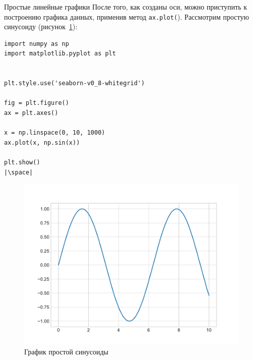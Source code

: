\documentclass[aspectratio=169, mathserif]{beamer}	%
\begin{document}
\begin{frame}[fragile, label=m]{Простые линейные графики}
\scriptsize
После того, как созданы оси, можно приступить к построению графика данных, применив метод \texttt{ax.plot(}). Рассмотрим простую синусоиду (рисунок~\ref{fig:fig_4}):
\vfill
\begin{minipage}{.4\textwidth}
\begin{verbatim}
import numpy as np
import matplotlib.pyplot as plt


plt.style.use('seaborn-v0_8-whitegrid')

fig = plt.figure()
ax = plt.axes()

x = np.linspace(0, 10, 1000)
ax.plot(x, np.sin(x))

plt.show()
|\space|
\end{verbatim}
\end{minipage}
\begin{minipage}{.59\textwidth}
\begin{figure}[h!]
	\centering
	\includegraphics[width=\linewidth]{./pics/Figure_4.pdf}
	\caption{График простой синусоиды}
	\label{fig:fig_4}
\end{figure}
\end{minipage}
\vfill
\end{frame}
\end{document}
